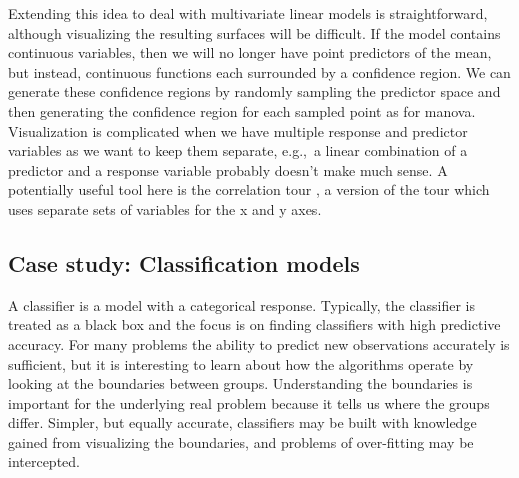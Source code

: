 \documentclass[preprint]{imsart}
\begin{document}

Extending this idea to deal with multivariate linear models is straightforward, although visualizing the resulting surfaces will be difficult.  If the model contains continuous variables, then we will no longer have point predictors of the mean, but instead, continuous functions each surrounded by a confidence region.  We can generate these confidence regions by randomly sampling the predictor space and then generating the confidence region for each sampled point as for {\sc manova}.  Visualization is complicated when we have multiple response and predictor variables as we want to keep them separate, e.g.,\ a linear combination of a predictor and a response variable probably doesn't make much sense.  A potentially useful tool here is the correlation tour \citep{buja:1996}, a version of the tour which uses separate sets of variables for the x and y axes.


\subsection{Case study: Classification models}
\label{sub:classifly}

A classifier is a model with a categorical response.  Typically, the classifier is treated as a black box and the focus is on finding classifiers with high predictive accuracy. For many problems the ability to predict new observations accurately is sufficient, but it is interesting to learn about how the algorithms operate by looking at the boundaries between groups. Understanding the boundaries is important for the underlying real problem because it tells us where the groups differ. Simpler, but equally accurate, classifiers may be built with knowledge gained from visualizing the boundaries, and problems of over-fitting may be intercepted.
\end{document}
